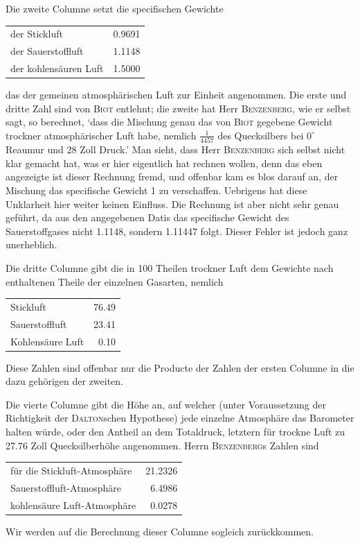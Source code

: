 \documentclass[12pt,a4paper]{article}
\begin{document}
Die zweite Columne setzt die specifischen Gewichte
\begin{center}
\begin{tabular}{l@{\ \ldots\ldots\ }r}
der Stickluft & 0.9691 \\
der Sauerstoffluft & 1.1148 \\
der kohlens\"auren Luft & 1.5000 \\
\end{tabular}
\end{center}
das der gemeinen atmosph\"arischen Luft zur Einheit angenommen. Die erste und dritte Zahl sind von \textsc{Biot} entlehnt; die zweite hat Herr \textsc{Benzenberg}, wie er selbst sagt, so berechnet, `dass die Mischung genau das von \textsc{Biot} gegebene Gewicht trockner atmosph\"arischer Luft habe, nemlich $\frac{1}{4457}$ des Quecksilbers bei $0^\circ$ Reaumur und 28 Zoll Druck.' Man sieht, dass Herr \textsc{Benzenberg} sich selbst nicht klar gemacht hat, was er hier eigentlich hat rechnen wollen, denn das eben angezeigte ist dieser Rechnung fremd, und offenbar kam es blos darauf an, der Mischung das specifische Gewicht 1 zu verschaffen. Uebrigens hat diese Unklarheit hier weiter keinen Einfluss. Die Rechnung ist aber nicht sehr genau gef\"uhrt, da aus den angegebenen Datis das specifische Gewicht des Sauerstoffgases nicht 1.1148, sondern 1.11447 folgt. Dieser Fehler ist jedoch ganz unerheblich.

\newpage
\noindent
Die dritte Columne gibt die in 100 Theilen trockner Luft dem Gewichte nach enthaltenen Theile der einzelnen Gasarten, nemlich
\begin{center}
\begin{tabular}{l@{\ \ldots\ldots\ }r@{\ Theile}}
Stickluft & 76.49 \\
Sauerstoffluft & 23.41 \\
Kohlens\"aure Luft & 0.10 \\
\end{tabular}
\end{center}
Diese Zahlen sind offenbar nur die Producte der Zahlen der ersten Columne in die dazu geh\"origen der zweiten.

Die vierte Columne gibt die H\"ohe an, auf welcher (unter Voraussetzung der Richtigkeit der \textsc{Dalton}schen Hypothese) jede einzelne Atmosph\"are das Barometer halten w\"urde, oder den Antheil an dem Totaldruck, letztern f\"ur trockne Luft zu 27.76 Zoll Quecksilberh\"ohe angenommen. Herrn \textsc{Benzenberg}s Zahlen sind
\begin{center}
\begin{tabular}{l@{\ \ldots\ldots\ }r@{\ Zoll}}
f\"ur die Stickluft-Atmosph\"are & 21.2326 \\
\quad\quad Sauerstoffluft-Atmosph\"are & 6.4986 \\
\quad\quad kohlens\"aure Luft-Atmosph\"are & 0.0278 \\
\end{tabular}
\end{center}
Wir werden auf die Berechnung dieser Columne sogleich zur\"uckkommen.
\end{document}

